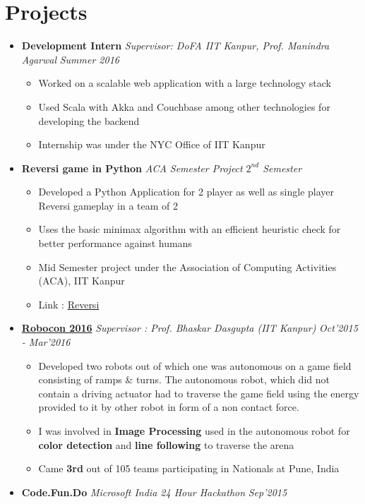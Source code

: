 \documentclass[11pt,a4paper]{moderncv}
\newcommand{\experience}[3]{
  \item \textbf{\large{#1}} \hfill \emph{#3} \hfill \textit{#2}
}
\begin{document}
  \section{Projects}
    \begin{itemize}
      \experience{Development Intern}{Summer 2016}{Supervisor: DoFA IIT Kanpur, Prof. Manindra Agarwal}
      \begin{itemize}
        \item Worked on a scalable web application with a large technology stack
        \item Used Scala with Akka and Couchbase among other technologies for developing the backend
        \item Internship was under the NYC Office of IIT Kanpur
      \end{itemize}
      \experience{Reversi game in Python}{$2^{nd}$ Semester}{ACA Semester Project}
      \begin{itemize}
        \item Developed a Python Application for 2 player as well as single player Reversi gameplay in a team of 2
        \item Uses the basic minimax algorithm with an efficient heuristic check for better performance against humans
        \item Mid Semester project under the Association of Computing Activities (ACA), IIT Kanpur
        \item Link : \href{http://github.com/yashsriv/Reversi-Python}{Reversi}
      \end{itemize}
      \experience{\href{http://students.iitk.ac.in/robocon/}{Robocon 2016}}{Oct'2015 - Mar'2016}{Supervisor : Prof. Bhaskar Dasgupta (IIT Kanpur)}
      \begin{itemize}
        \item Developed two robots out of which one was autonomous on a game field consisting of ramps \& turns. The autonomous robot, which did not contain a driving actuator had to traverse the game field using the energy provided to it by other robot in form of a non contact force.
        \item I was involved in \textbf{Image Processing} used in the autonomous robot for \textbf{color detection} and \textbf{line following} to traverse the arena
        \item Came \textbf{3rd} out of 105 teams participating in Nationals at Pune, India
      \end{itemize}
      \experience{Code.Fun.Do}{Sep'2015}{Microsoft India 24 Hour Hackathon}

\end{itemize}
\end{document}
